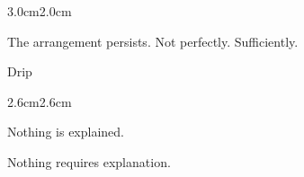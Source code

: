 \begin{adjustwidth}{3.0cm}{2.0cm}

The arrangement persists. Not perfectly. Sufficiently.

\vspace{2em}

\end{adjustwidth}

\begin{center}
Drip
\end{center}

\begin{adjustwidth}{2.6cm}{2.6cm}

Nothing is explained.

\vspace{1em}

Nothing requires explanation.

\vspace{2em}

\end{adjustwidth}
